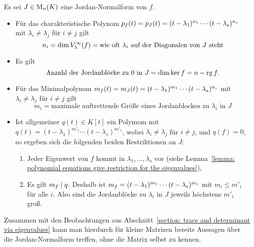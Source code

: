 Es sei $J \in \operatorname{M}_{n}(K)$ eine Jordan-Normalform von $f$.
\begin{itemize}
  \item
    Für das charakteristische Polynom $p_{f}(t) = p_{J}(t) = (t - \lambda_1)^{n_1} \dotsm (t - \lambda_s)^{n_s}$ mit $\lambda_i \neq \lambda_j$ für $i \neq j$ gilt
    \[
        n_i
      = \dim V_{\lambda}^{\infty}(f)
      = \text{wie oft $\lambda_i$ auf der Diagonalen von $J$ steht}
    \]
  \item
    Es gilt
    \[
        \text{Anzahl der Jordanblöcke zu $0$ in $J$}
      = \dim \ker f
      = n - \operatorname{rg} f.
    \]
  \item
    Für das Minimalpolynom $m_{f}(t) = m_{J}(t) = (t - \lambda_1)^{m_1} \dotsm (t - \lambda_s)^{n_s}$ mit $\lambda_i \neq \lambda_j$ für $i \neq j$ gilt
    \[
        m_i
      = \text{maximale auftrettende Größe eines Jordanblockes zu $\lambda_i$ in $J$}
    \]
  \item
    Ist allgemeiner $q(t) \in K[t]$ ein Polymom mit $q(t) = (t - \lambda_1)^{m'_1} \dotsm (t - \lambda_s)^{m'_s}$, wobei $\lambda_i \neq \lambda_j$ für $i \neq j$, und $q(f) = 0$, so ergeben sich die folgenden beiden Restriktionen an $J$:
    \begin{enumerate}
      \item
        Jeder Eigenwert von $f$ kommt in $\lambda_1, \dotsc, \lambda_s$ vor (siehe Lemma~\ref{lemma: polynomial equations give restriction for the eigenvalues}),
      \item
        Es gilt $m_{f} \mid q$.
        Deshalb ist $m_{f} = (t - \lambda_1)^{m_1} \dotsm (t - \lambda_s)^{m_s}$ mit $m_i \leq m'_i$ für alle $i$.
        Also sind die Jordanblöcke zu $\lambda_i$ in $J$ jeweils höchstens $m'_i$ groß.
    \end{enumerate}
\end{itemize}

Zusammen mit den Beobachtungen aus Abschnitt~\ref{section: trace and determinant via eigenvalues} kann man hierdurch für kleine Matrizen bereits Aussagen über die Jordan-Nor\-mal\-form treffen, ohne die Matrix selbst zu kennen.














